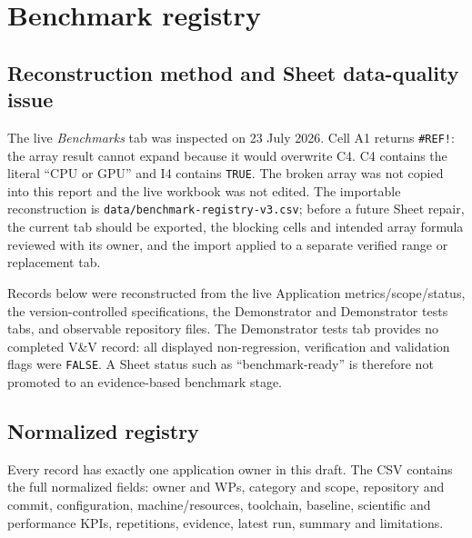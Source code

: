\chapter{Benchmark registry}
\label{chap:benchmark-registry}

\section{Reconstruction method and Sheet data-quality issue}
The live \emph{Benchmarks} tab was inspected on 23 July 2026.  Cell A1 returns
\texttt{\#REF!}: the array result cannot expand because it would overwrite C4.
C4 contains the literal ``CPU or GPU'' and I4 contains \texttt{TRUE}.  The broken
array was not copied into this report and the live workbook was not edited.  The
importable reconstruction is \texttt{data/benchmark-registry-v3.csv}; before a
future Sheet repair, the current tab should be exported, the blocking cells and
intended array formula reviewed with its owner, and the import applied to a
separate verified range or replacement tab.

Records below were reconstructed from the live Application metrics/scope/status,
the version-controlled specifications, the Demonstrator and Demonstrator tests
tabs, and observable repository files.  The Demonstrator tests tab provides no
completed V\&V record: all displayed non-regression, verification and validation
flags were \texttt{FALSE}.  A Sheet status such as ``benchmark-ready'' is
therefore not promoted to an evidence-based benchmark stage.

\section{Normalized registry}
Every record has exactly one application owner in this draft.  The CSV contains
the full normalized fields: owner and WPs, category and scope, repository and
commit, configuration, machine/resources, toolchain, baseline, scientific and
performance KPIs, repetitions, evidence, latest run, summary and limitations.

